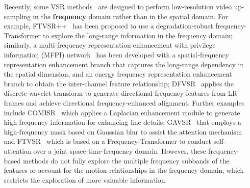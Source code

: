 








Recently, some VSR methods~\cite{qiu2022learning, qiu2023learning,li2023multi,dong2023dfvsr} are designed to perform low-resolution video up-sampling in the \textbf{frequency} domain rather than in the spatial domain. For example, FTVSR++~\cite{qiu2023learning} has been proposed to use a degradation-robust frequency-Transformer to explore the long-range information in the frequency domain; similarly, a multi-frequency representation enhancement with privilege information (MFPI) network~\cite{li2023multi} has been developed with a spatial-frequency representation enhancement branch that captures the long-range dependency in the spatial dimension, and an energy frequency representation enhancement branch to obtain the inter-channel feature relationship; DFVSR~\cite{dong2023dfvsr} applies the discrete wavelet transform to generate directional frequency features from LR frames and achieve directional frequency-enhanced alignment. Further examples include COMISR~\cite{li2021comisr} which applies a Laplacian enhancement module to generate high-frequency information for enhancing fine details, GAVSR~\cite{chen2023gaussian} that employs a high-frequency mask based on Gaussian blur to assist the attention mechanism and FTVSR~\cite{qiu2022learning} which is based on a Frequency-Transformer to conduct self-attention over a joint space-time-frequency domain. However, these frequency-based methods do not fully explore the multiple frequency subbands of the features or account for the motion relationships in the frequency domain, which restricts the exploration of more valuable information.

